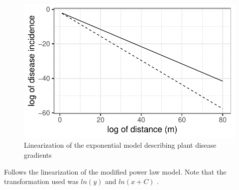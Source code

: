 \documentclass[
  letterpaper,
  DIV=11,
  numbers=noendperiod]{scrreprt}
\begin{document}
\begin{figure}[H]

{\centering \includegraphics{spatial-models_files/figure-pdf/fig-exp2-1.pdf}

}

\caption{\label{fig-exp2}Linearization of the exponential model
describing plant disease gradients}

\end{figure}

Follows the linearization of the modified power law model. Note that the
transformation used was \(ln(y)\) and \(ln(x+C)\) .
\end{document}
